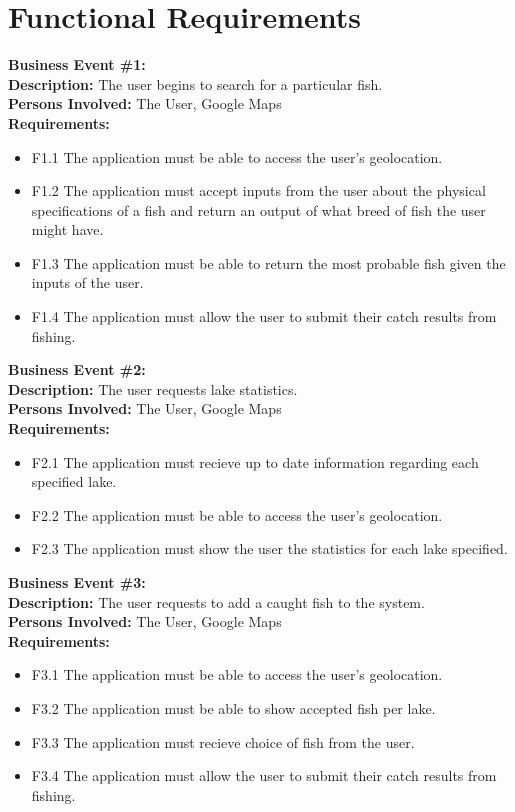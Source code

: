 \documentclass{article}
\begin{document}
\section{Functional Requirements}

	\noindent\textbf{Business Event \#1:} \\
	\textbf{Description:} The user begins to search for a particular fish. \\
	\textbf{Persons Involved:} The User, Google Maps \\
	\textbf{Requirements:}
	\begin{itemize}
		\item F1.1 The application must be able to access the user's geolocation.
		\item F1.2 The application must accept inputs from the user about the physical specifications of a fish and return an output of what breed of fish the user might have.
		\item F1.3 The application must be able to return the most probable fish given the inputs of the user.
		\item F1.4 The application must allow the user to submit their catch results from fishing.
	\end{itemize}

	\noindent\textbf{Business Event \#2:} \\
	\textbf{Description:} The user requests lake statistics. \\
	\textbf{Persons Involved:} The User, Google Maps \\
	\textbf{Requirements:}
	\begin{itemize}
		\item F2.1 The application must recieve up to date information regarding each specified lake.
		\item F2.2 The application must be able to access the user's geolocation.
		\item F2.3 The application must show the user the statistics for each lake specified.
	\end{itemize}

	\noindent\textbf{Business Event \#3:} \\
	\textbf{Description:} The user requests to add a caught fish to the system. \\
	\textbf{Persons Involved:} The User, Google Maps \\
	\textbf{Requirements:}
	\begin{itemize}
		\item F3.1 The application must be able to access the user's geolocation.
		\item F3.2 The application must be able to show accepted fish per lake.
		\item F3.3 The application must recieve choice of fish from the user.
		\item F3.4 The application must allow the user to submit their catch results from fishing.
	\end{itemize}
\end{document}
